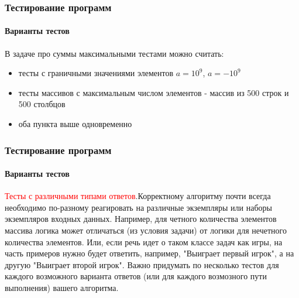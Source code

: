 \documentclass[aspectratio=169]{beamer}
\begin{document}
\begin{frame}
\frametitle{Тестирование программ}
\framesubtitle{Варианты тестов}
\justifying
\small
В задаче про суммы максимальными тестами можно считать:
\begin{itemize}
\item{тесты с граничными значениями элементов $a = 10^9$, $a = -10^9$}
\item{тесты массивов с максимальным числом элементов - массив из 500 строк и 500 столбцов}
\item{оба пункта выше одновременно}
\end{itemize}

\begin{figure}
    \captionsetup[subfigure]{labelformat=empty}
    \centering
\end{figure}
\end{frame}

\begin{frame}
\frametitle{Тестирование программ}
\framesubtitle{Варианты тестов}
\justifying
\textcolor{red}{Тесты с различными типами ответов}.\newline Корректному алгоритму почти всегда необходимо по-разному реагировать на различные экземпляры или наборы экземпляров входных данных.\newline\newline
Например, для четного количества элементов массива логика может отличаться (из условия задачи) от логики для нечетного количества элементов.\newline\newline
Или, если речь идет о таком классе задач как игры, на часть примеров нужно будет ответить, например, "Выиграет первый игрок", а на другую "Выиграет второй игрок".\newline\newline
Важно придумать по несколько тестов для каждого возможного варианта ответов (или для каждого возмозного пути выполнения) вашего алгоритма.

\end{frame}
\end{document}
